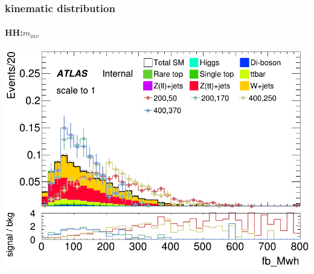 \documentclass[usenames,dvipsnames]{beamer}
\begin{document}
\begin{frame}

	\frametitle{kinematic distribution}
	\framesubtitle{HH:$m_{inv}$}
    \begin{minipage}{0.32\textwidth}
        \centering
        \setlength{\fboxsep}{0pt} %
        \setlength{\fboxrule}{1pt} %
    \end{minipage}
    \hfill
    \begin{minipage}{0.32\textwidth}
        \centering
        \includegraphics[width=\textwidth]{graphics/HH_met_sig/HH_fb_Mwh_norm.png}
    \end{minipage}
    \hfill
    \begin{minipage}{0.32\textwidth}

\end{minipage}
\end{frame}
\end{document}
